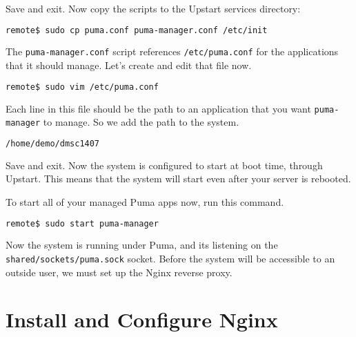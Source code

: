 Save and exit.
Now copy the scripts to the Upstart services directory:

\begin{minipage}{\linewidth}
\begin{lstlisting}[language=bash]
remote$ sudo cp puma.conf puma-manager.conf /etc/init
\end{lstlisting}
\end{minipage}

The \texttt{puma-manager.conf} script references \texttt{/etc/puma.conf}
for the applications that it should manage.
Let's create and edit that file now.

\begin{minipage}{\linewidth}
\begin{lstlisting}[language=bash]
remote$ sudo vim /etc/puma.conf
\end{lstlisting}
\end{minipage}

Each line in this file should be the path to an application that you
want \texttt{puma-manager} to manage. So we add the path to the system.

\begin{minipage}{\linewidth}
  \begin{lstlisting}[language=bash, caption={/etc/puma.conf}]
/home/demo/dmsc1407
\end{lstlisting}
\end{minipage}

Save and exit. Now the system is configured to start at boot time,
through Upstart. This means that the system will start even after
your server is rebooted.

To start all of your managed Puma apps now, run this command.

\begin{minipage}{\linewidth}
\begin{lstlisting}[language=bash]
remote$ sudo start puma-manager
\end{lstlisting}
\end{minipage}

Now the system is running under Puma,
and it\textquotesingle s listening on the \texttt{shared/sockets/puma.sock} socket.
Before the system will be accessible to an outside user,
we must set up the Nginx reverse proxy.

\section{Install and Configure Nginx}

